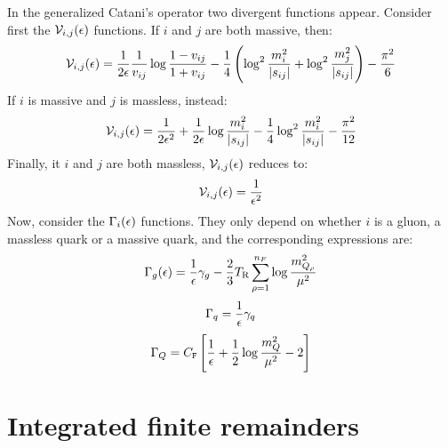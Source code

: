 In the generalized Catani's operator  two divergent functions appear. Consider first the $ \mathcal{V}_{i,j}(\epsilon) $ functions. If $ i $ and $ j $ are both massive, then:
\begin{equation}
  \mathcal{V}_{i,j}(\epsilon) = \frac{1}{2\epsilon} \frac{1}{v_{ij}} \log \frac{1 - v_{ij}}{1 + v_{ij}} - \frac{1}{4} \left( \log^2 \frac{m_i^2}{\left\lvert s_{ij}\right\rvert} + \log^2 \frac{m_j^2}{\left\lvert s_{ij}\right\rvert} \right) - \frac{\pi^2}{6}
  \label{eq:n-mm}
\end{equation}
If $ i $ is massive and $ j $ is massless, instead:
\begin{equation}
  \mathcal{V}_{i,j}(\epsilon) = \frac{1}{2\epsilon^2} + \frac{1}{2\epsilon} \log \frac{m_i^2}{\left\lvert s_{ij}\right\rvert} - \frac{1}{4} \log^2 \frac{m_i^2}{\left\lvert s_{ij}\right\rvert} - \frac{\pi^2}{12}
  \label{eq:n-mnm}
\end{equation}
Finally, it $ i $ and $ j $ are both massless, $ \mathcal{V}_{i,j}(\epsilon) $ reduces to:
\begin{equation}
  \mathcal{V}_{i,j}(\epsilon) = \frac{1}{\epsilon^2}
  \label{eq:n-nmnm}
\end{equation}
Now, consider the $ \Gamma_i(\epsilon) $ functions. They only depend on whether $ i $ is a gluon, a massless quark or a massive quark, and the corresponding expressions are:
\begin{equation}
  \Gamma_g(\epsilon) = \frac{1}{\epsilon} \gamma_g - \frac{2}{3} T_\text{R} \sum_{\rho = 1}^{n_F} \log \frac{m_{Q_\rho}^2}{\mu^2}
  \label{eq:g-g}
\end{equation}
\begin{equation}
  \Gamma_q = \frac{1}{\epsilon} \gamma_q
  \label{eq:g-q}
\end{equation}
\begin{equation}
  \Gamma_Q = C_\mathtt{F} \left[ \frac{1}{\epsilon} + \frac{1}{2} \log \frac{m_Q^2}{\mu^2} - 2 \right]
  \label{eq:g-qm}
\end{equation}

\section{Integrated finite remainders}
\label{sec:gen-count}


